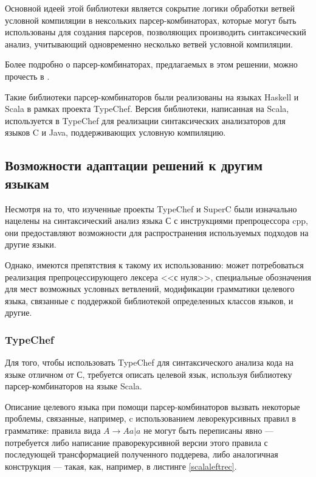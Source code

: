 Основной идеей этой библиотеки является сокрытие логики обработки ветвей условной компиляции в нексольких парсер-комбинаторах, которые могут быть использованы для создания парсеров, позволяющих производить синтаксический анализ, учитывающий одновременно несколько ветвей условной компиляции.


Более подробно о парсер-комбинаторах, предлагаемых в этом решении, можно прочесть в \cite{typechef2}.

Такие библиотеки парсер-комбинаторов были реализованы на языках Haskell и Scala в рамках проекта TypeChef. Версия библиотеки, написанная на Scala, используется в TypeChef для реализации синтаксических анализаторов для языков C и Java, поддерживающих условную компиляцию.

\subsection{Возможности адаптации решений к другим языкам}
\label{subsec:solutionsadaptation}

Несмотря на то, что изученные проекты TypeChef и SuperC были изначально нацелены на синтаксический анализ языка С с инструкциями препроцессора cpp, они предоставляют возможности для распространения используемых подходов на другие языки. 

Однако, имеются препятствия к такому их использованию: может потребоваться реализация препроцессирующего лексера <<с нуля>>, специальные обозначения для мест возможных условных ветвлений, модификации грамматики целевого языка, связанные с поддержкой библиотекой определенных классов языков, и другие.

\subsubsection{TypeChef}

Для того, чтобы использовать TypeChef для синтаксического анализа кода на языке отличном от С, требуется описать целевой язык, используя библиотеку парсер-комбинаторов на языке Scala.

Описание целевого языка при помощи парсер-комбинаторов вызвать некоторые проблемы, связанные, например, c использованием леворекурсивных правил в грамматике: правила вида $A \to A a | a$ не могут быть переписаны явно --- потребуется либо написание праворекурсивной версии этого правила с последующей трансформацией полученного поддерева, либо аналогичная конструкция --- такая, как, например, в листинге \ref{scalaleftrec}.

